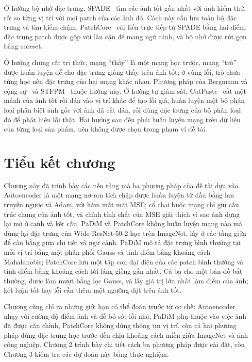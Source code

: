 Ở hướng bộ nhớ đặc trưng, SPADE~\cite{cohenSubImageAnomalyDetection2020} tìm các ảnh tốt gần nhất với ảnh kiểm thử,
rồi so từng vị trí với mọi patch của các ảnh đó. Cách này cần lưu toàn bộ đặc trưng và tìm kiếm chậm.
PatchCore~\cite{rothTotalRecallIndustrial2022} cải tiến trực tiếp từ SPADE bằng hai điểm: đặc trưng patch được gộp
với lân cận để mang ngữ cảnh, và bộ nhớ được rút gọn bằng coreset.

Ở hướng chưng cất tri thức, mạng ``thầy'' là một mạng học trước, mạng ``trò'' được huấn luyện để cho đặc trưng giống
thầy trên ảnh tốt; ở vùng lỗi, trò chưa từng học nên đặc trưng của hai mạng khác nhau. Phương pháp
của Bergmann và cộng sự~\cite{bergmannUninformedStudentsStudentTeacher2020} và
STFPM~\cite{wangStudentTeacherFeaturePyramid2021} thuộc hướng này. Ở hướng tự giám sát,
CutPaste~\cite{liCutPasteSelfSupervisedLearning2021} cắt một mảnh của ảnh tốt rồi dán vào vị trí khác để tạo lỗi
giả, huấn luyện một bộ phân loại phân biệt ảnh gốc với ảnh đã cắt dán, rồi dùng đặc trưng của bộ phân loại đó để
phát hiện lỗi thật. Hai hướng sau đều phải huấn luyện mạng trên dữ liệu của từng loại sản phẩm, nên không được chọn
trong phạm vi đề tài.

\section*{Tiểu kết chương}  %

Chương này đã trình bày các nền tảng mà ba phương pháp của đề tài dựa vào. Autoencoder là một mạng nơ-ron tích chập
được huấn luyện từ đầu bằng lan truyền ngược và Adam, với hàm mất mát MSE; cổ chai buộc mạng chỉ giữ cấu trúc chung
của ảnh tốt, và chính tính chất của MSE giải thích vì sao ảnh dựng lại mờ ở cạnh và kết cấu. PaDiM và PatchCore không
huấn luyện mạng nào mà dùng lại đặc trưng của Wide-ResNet-50-2 học trên ImageNet, lấy ở các tầng giữa để cân bằng giữa
chi tiết và ngữ cảnh. PaDiM mô tả đặc trưng bình thường tại mỗi vị trí bằng một phân phối Gauss và tính điểm bằng
khoảng cách Mahalanobis; PatchCore lưu một tập con đại diện của các patch bình thường và tính điểm bằng khoảng cách tới
láng giềng gần nhất. Cả ba cho một bản đồ bất thường, được làm mượt bằng lọc Gauss, và lấy giá trị lớn nhất làm điểm
của ảnh; kết luận tốt hay lỗi cần thêm một ngưỡng đặt trên ảnh tốt.

Chương cũng chỉ ra những giới hạn có thể đoán trước từ cơ chế: Autoencoder nhạy với cường độ điểm ảnh và dễ bỏ sót
lỗi nhỏ, PaDiM phụ thuộc vào việc ảnh đã được căn chỉnh, PatchCore không dùng thông tin vị trí, còn cả hai phương pháp
dùng đặc trưng học trước đều chịu khoảng cách miền giữa ImageNet và ảnh công nghiệp. Chương 2 trình bày chi tiết cách
ba phương pháp được cài đặt, còn Chương 3 kiểm tra các dự đoán này bằng thực nghiệm.
